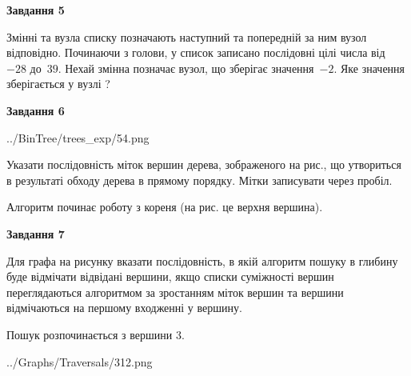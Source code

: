 \documentclass[12pt, ukrainian]{article}
\begin{document}
{\begin {large}
{\begin {center}\textbf{Завдання 5}\end {center}}\par
Змінні  та  вузла списку позначають наступний та попередній за ним вузол відповідно. Починаючи з голови, у список записано послідовні цілі числа від~$-28$ до~$39$. Нехай змінна  позначає вузол, що зберігає значення~$-2$.
Яке значення зберігається у вузлі  ?\par
\newpage

{\begin {center}\textbf{Завдання 6}\end {center}}\par

\begin{center}
	{../BinTree/trees_exp/54.png}
\end{center}
Указати послідовність міток вершин дерева, зображеного на рис., що утвориться в результаті обходу дерева в прямому порядку. Мітки записувати через пробіл.\par Алгоритм починає роботу з кореня (на рис. це верхня вершина).\par
\newpage

{\begin {center}\textbf{Завдання 7}\end {center}}\par
Для графа на рисунку вказати послідовність, в якій алгоритм пошуку в глибину буде відмічати відвідані вершини, якщо списки суміжності вершин переглядаються алгоритмом за зростанням міток вершин та вершини відмічаються на першому вход\-женні у вершину.\par
Пошук розпочинається з вершини 3.\par

\begin{center}
	{../Graphs/Traversals/312.png}
\end{center}\par
\newpage


\end{large}}
\end{document}
